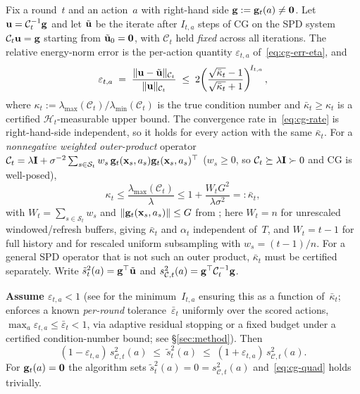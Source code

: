 \documentclass[twoside]{article}
\newcommand{\Calg}{\mathcal{C}}                 %
\newcommand{\cHist}{\mathcal{H}}                %
\begin{document}
\begin{lemma}\label{lem:cg}
Fix a round~$t$ and an action~$a$ with right-hand side
$\mathbf{g}:=\mathbf{g}_t(a)\ne\mathbf0$.  Let $\bu = \Calg_t^{-1}\bg$ and let $\tilde{\mathbf{u}}$ be
the iterate after $I_{t,a}$ steps of CG on the SPD system $\Calg_t\bu=\bg$
starting from $\tilde{\mathbf{u}}_0=\mathbf{0}$, with $\Calg_t$ held \emph{fixed} across
all iterations.  The relative energy-norm error is the per-action quantity
$\varepsilon_{t,a}$ of~\eqref{eq:cg-err-eta}, and
\begin{equation}\label{eq:cg-rate}
  \varepsilon_{t,a}
  \;=\;
  \frac{\|\bu-\tilde\bu\|_{\Calg_t}}{\|\bu\|_{\Calg_t}}
  \;\le\;
  2\!\left(\frac{\sqrt{\bar\kappa_t}-1}{\sqrt{\bar\kappa_t}+1}\right)^{\!I_{t,a}},
\end{equation}
where
$\kappa_t:=\lambda_{\max}(\Calg_t)/\lambda_{\min}(\Calg_t)$ is the true
condition number and $\bar\kappa_t\ge\kappa_t$ is a certified
$\cHist_t$-measurable upper bound.  The convergence rate in~\eqref{eq:cg-rate} is right-hand-side
independent, so it holds for every action with the same $\bar\kappa_t$.
For a \emph{nonnegative weighted outer-product} operator
$\Calg_t=\lambda\bI+\sigma^{-2}\sum_{s\in\mathcal{S}_t}w_s\,
\bg_t(\bx_s,a_s)\bg_t(\bx_s,a_s)^\top$ ($w_s\ge0$, so
$\Calg_t\succeq\lambda\bI\succ0$ and CG is well-posed),
\[
\kappa_t\le\frac{\lambda_{\max}(\Calg_t)}{\lambda}
\le1+\frac{W_tG^2}{\lambda\sigma^2}=: \bar\kappa_t,
\]
with $W_t=\sum_{s\in\mathcal{S}_t}w_s$ and
$\|\mathbf{g}_t(\mathbf{x}_s,a_s)\|\le G$ from ; here $W_t=n$ for unrescaled
windowed/refresh buffers, giving $\bar\kappa_t$ and $\alpha_t$ independent
of~$T$, and $W_t=t{-}1$ for full history and for rescaled uniform subsampling
with $w_s=(t{-}1)/n$.  For a general SPD operator that is not such an outer
product, $\bar\kappa_t$ must be certified separately.
Write $\tilde{s}_t^2(a) = \mathbf{g}^\top\tilde{\mathbf{u}}$ and
$s_{\Calg,t}^2(a)=\bg^\top\Calg_t^{-1}\bg$.

\textbf{Assume $\varepsilon_{t,a} < 1$}
(see  for the minimum~$I_{t,a}$ ensuring this as a function
of~$\bar\kappa_t$;
 enforces a known \emph{per-round} tolerance~$\bar\varepsilon_t$
uniformly over the scored actions, $\max_a\varepsilon_{t,a}\le\bar\varepsilon_t<1$,
via adaptive residual stopping or a fixed budget under a certified
condition-number bound; see \S\ref{sec:method}).
Then
\begin{equation}\label{eq:cg-quad}
  (1-\varepsilon_{t,a})\,s_{\Calg,t}^2(a)
  \;\le\;
  \tilde{s}_t^2(a)
  \;\le\;
  (1+\varepsilon_{t,a})\,s_{\Calg,t}^2(a).
\end{equation}
For $\mathbf{g}_t(a)=\mathbf0$ the algorithm sets
$\tilde{s}_t^2(a)=0=s_{\Calg,t}^2(a)$ and~\eqref{eq:cg-quad} holds trivially.
\end{lemma}
\end{document}

